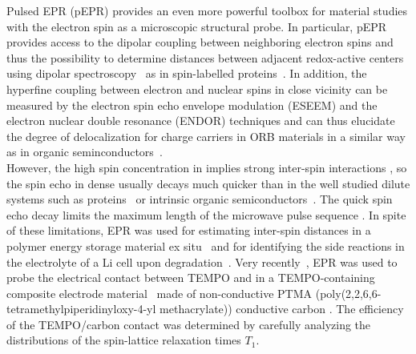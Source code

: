 Pulsed EPR (pEPR) provides an even more powerful toolbox for material studies with the electron spin as a microscopic structural probe. In particular, pEPR provides access to the dipolar coupling between neighboring electron spins and thus the possibility to determine distances between adjacent redox-active centers using dipolar spectroscopy~\cite{Salikhov1981} as in spin-labelled proteins~\cite{jeschke2012_annrevphyschem,Toropov1998}. In addition, the hyperfine coupling between electron and nuclear spins in close vicinity can be measured by the electron spin echo envelope modulation (ESEEM) and the electron nuclear double resonance (ENDOR) techniques and can thus elucidate the degree of delocalization for charge carriers in ORB materials in a similar way as in organic seminconductors~\cite{Behrends2011}.\\

However, the high spin concentration in  implies strong inter-spin interactions , so the spin echo in  dense usually decays much quicker than in the well studied dilute systems such as proteins~\cite{jeschke2012_annrevphyschem} or intrinsic organic semiconductors~\cite{Tait2021}. The quick spin echo decay limits the maximum length of the microwave pulse sequence . In spite of these limitations, EPR was used for estimating inter-spin distances in a polymer energy storage material ex situ~\cite{Assumma2020} and for identifying the side reactions in the electrolyte of a Li cell upon degradation~\cite{Szczuka2021}. Very recently~\cite{Daniel2023}, EPR was used to probe the electrical contact between TEMPO and   in a TEMPO-containing composite electrode material~\cite{IWASA2007} made of non-conductive PTMA (poly(2,2,6,6- tetramethylpiperidinyloxy-4-yl methacrylate))  conductive carbon . The efficiency of the TEMPO/carbon contact was determined by carefully analyzing the distributions of the spin-lattice relaxation times $T_1$. \\







